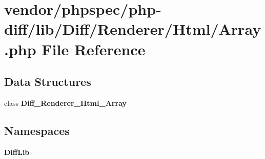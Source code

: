 \section{vendor/phpspec/php-\/diff/lib/\+Diff/\+Renderer/\+Html/\+Array.php File Reference}
\label{_array_8php}
\subsection*{Data Structures}
\begin{DoxyCompactItemize}
\item 
class {\bf Diff\+\_\+\+Renderer\+\_\+\+Html\+\_\+\+Array}
\end{DoxyCompactItemize}
\subsection*{Namespaces}
\begin{DoxyCompactItemize}
\item 
 {\bf Diff\+Lib}
\end{DoxyCompactItemize}
